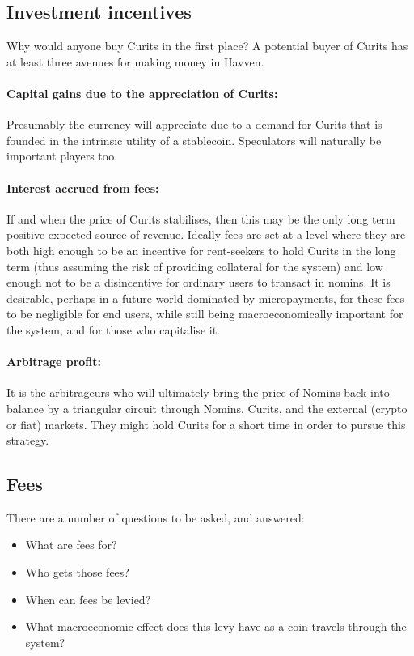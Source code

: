 \subsection{Investment incentives}

Why would anyone buy Curits in the first place? A potential buyer of Curits has at least three avenues for making money in Havven.

\paragraph{Capital gains due to the appreciation of Curits:}
Presumably the currency will appreciate due to a demand for Curits that is founded in the intrinsic utility of a stablecoin. Speculators will naturally be important players too.

\paragraph{Interest accrued from fees:}
If and when the price of Curits stabilises, then this may be the only long term positive-expected source of revenue. Ideally fees are set at a level where they are both high enough to be an incentive for rent-seekers to hold Curits in the long term (thus assuming the risk of providing collateral for the system) and low enough not to be a disincentive for ordinary users to transact in nomins.
It is desirable, perhaps in a future world dominated by micropayments, for these fees to be negligible for end users, while still being macroeconomically important for the system, and for those who capitalise it.

\paragraph{Arbitrage profit:}
It is the arbitrageurs who will ultimately bring the price of Nomins back into balance by a triangular circuit through Nomins, Curits, and the external (crypto or fiat) markets. They might hold Curits for a short time in order to pursue this strategy.


\pagebreak
\subsection{Fees}
There are a number of questions to be asked, and answered:
\begin{itemize}
    \item What are fees for?
    \item Who gets those fees?
    \item When can fees be levied?
    \item What macroeconomic effect does this levy have as a coin travels through the system?
\end{itemize}

